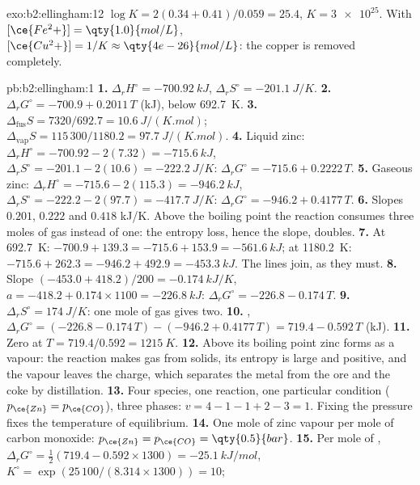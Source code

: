 \begin{solution}{exo:b2:ellingham:12}
$\log K = 2(0.34 + 0.41)/0.059 = 25.4$, $K = \num{3e25}$. With
$[\ce{Fe^2+}] = \qty{1.0}{mol/L}$, $[\ce{Cu^2+}] = 1/K \approx
\qty{4e-26}{mol/L}$: the copper is removed completely.
\end{solution}

\begin{solution}{pb:b2:ellingham:1}
\textbf{1.} $\Delta_r H^\circ = \qty{-700.92}{kJ}$, $\Delta_r S^\circ =
\qty{-201.1}{J/K}$.
\textbf{2.} $\Delta_r G^\circ = -700.9 + 0.2011\,T$ (\unit{kJ}), below
\qty{692.7}{K}.
\textbf{3.} $\Delta_{\text{fus}}S = 7320/692.7 = \qty{10.6}{J/(K.mol)}$;
$\Delta_{\text{vap}}S = 115\,300/1180.2 = \qty{97.7}{J/(K.mol)}$.
\textbf{4.} Liquid zinc: $\Delta_r H^\circ = -700.92 - 2(7.32) = \qty{-715.6}{kJ}$,
$\Delta_r S^\circ = -201.1 - 2(10.6) = \qty{-222.2}{J/K}$: $\Delta_r G^\circ =
-715.6 + 0.2222\,T$.
\textbf{5.} Gaseous zinc: $\Delta_r H^\circ = -715.6 - 2(115.3) = \qty{-946.2}{kJ}$,
$\Delta_r S^\circ = -222.2 - 2(97.7) = \qty{-417.7}{J/K}$: $\Delta_r G^\circ =
-946.2 + 0.4177\,T$.
\textbf{6.} Slopes $0.201$, $0.222$ and $0.418$ \unit{kJ/K}. Above the boiling
point the reaction consumes three moles of gas instead of one: the entropy
loss, hence the slope, doubles.
\textbf{7.} At \qty{692.7}{K}: $-700.9 + 139.3 = -715.6 + 153.9 = \qty{-561.6}{kJ}$;
at \qty{1180.2}{K}: $-715.6 + 262.3 = -946.2 + 492.9 = \qty{-453.3}{kJ}$. The
lines join, as they must.
\textbf{8.} Slope $(-453.0 + 418.2)/200 = \qty{-0.174}{kJ/K}$, $a = -418.2 +
0.174 \times 1100 = \qty{-226.8}{kJ}$: $\Delta_r G^\circ = -226.8 - 0.174\,T$.
\textbf{9.} $\Delta_r S^\circ = \qty{+174}{J/K}$: one mole of gas gives two.
\textbf{10.} , $\Delta_r G^\circ = (-226.8 - 0.174\,T)
- (-946.2 + 0.4177\,T) = 719.4 - 0.592\,T$ (\unit{kJ}).
\textbf{11.} Zero at $T = 719.4/0.592 = \qty{1215}{K}$.
\textbf{12.} Above its boiling point zinc forms as a vapour: the reaction makes
gas from solids, its entropy is large and positive, and the vapour leaves the
charge, which separates the metal from the ore and the coke by distillation.
\textbf{13.} Four species, one reaction, one particular condition ($p_{\ce{Zn}} =
p_{\ce{CO}}$), three phases: $v = 4 - 1 - 1 + 2 - 3 = 1$. Fixing the pressure
fixes the temperature of equilibrium.
\textbf{14.} One mole of zinc vapour per mole of carbon monoxide:
$p_{\ce{Zn}} = p_{\ce{CO}} = \qty{0.5}{bar}$.
\textbf{15.} Per mole of , $\Delta_r G^\circ = \frac12(719.4 - 0.592 \times
1300) = \qty{-25.1}{kJ/mol}$, $K^\circ = \exp(25\,100/(8.314 \times 1300)) = 10$;

\end{solution}
